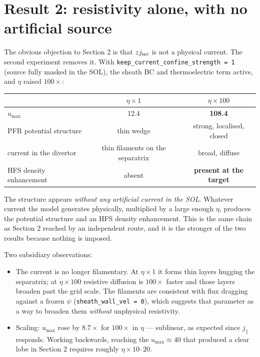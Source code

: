 \documentclass[11pt,a4paper]{article}
\newcommand{\code}[1]{\texttt{\small #1}}
\newcommand{\jpar}{j_\parallel}
\begin{document}
\section{Result 2: resistivity alone, with no artificial source}

The obvious objection to Section 2 is that $zj_{\rm src}$ is not a physical current. The
second experiment removes it. With \code{keep\_current\_confine\_strength = 1} (source fully
masked in the SOL), the sheath BC and thermoelectric term active, and $\eta$ raised
$100\times$:

\begin{center}
\begin{tabular}{lcc}
\toprule
 & $\eta\times1$ & $\eta\times100$ \\
\midrule
$u_{\max}$                & 12.4 & \textbf{108.4} \\
PFR potential structure   & thin wedge & strong, localised, closed \\
current in the divertor   & thin filaments on the separatrix & broad, diffuse \\
HFS density enhancement   & absent & \textbf{present at the target} \\
\bottomrule
\end{tabular}
\end{center}

\noindent The structure appears \emph{without any artificial current in the SOL}. Whatever
current the model generates physically, multiplied by a large enough $\eta$, produces the
potential structure and an HFS density enhancement. This is the same chain as Section 2
reached by an independent route, and it is the stronger of the two results because nothing is
imposed.

Two subsidiary observations:

\begin{itemize}\itemsep2pt
\item The current is no longer filamentary. At $\eta\times1$ it forms thin layers hugging the
      separatrix; at $\eta\times100$ resistive diffusion is $100\times$ faster and those layers
      broaden past the grid scale. The filaments are consistent with flux dragging against a
      frozen $\psi$ (\code{sheath\_wall\_vel = 0}), which suggests that parameter as a way to
      broaden them \emph{without} unphysical resistivity.
\item Scaling: $u_{\max}$ rose by $8.7\times$ for $100\times$ in $\eta$ --- sublinear, as
      expected since $\jpar$ responds. Working backwards, reaching the $u_{\max}\approx40$ that
      produced a clear lobe in Section 2 requires roughly $\eta\times10$--$20$.
\end{itemize}
\end{document}
